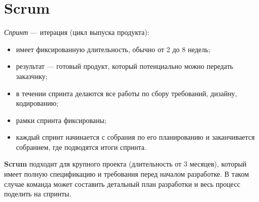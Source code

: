 \documentclass[a4paper,12pt,oneside]{extbook}
\begin{document}
\section{Scrum}%
\label{sec:Scrum}

\textit{Спринт} — итерация (цикл выпуска продукта):
\begin{itemize}
    \item имеет фиксированную длительность, обычно от 2 до 8 недель;
    \item результат — готовый продукт, который потенциально можно передать заказчику;
    \item в течении спринта делаются все работы по сбору требований, дизайну, кодированию;
    \item рамки спринта фиксированы;
    \item каждый спринт начинается с собрания по его планированию и заканчивается собранием, где подводятся итоги спринта.
\end{itemize}

\textbf{Scrum} подходит для крупного проекта (длительность от 3 месяцев), который имеет полную спецификацию и требования перед началом разработке. В таком случае команда может составить детальный план разработки и весь процесс поделить на спринты.
\end{document}
